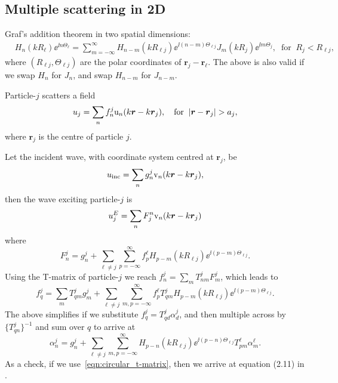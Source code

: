 \documentclass[ 12pt, a4paper]{article}
\renewcommand{\vec}[1]{\boldsymbol{#1}}
\begin{document}
\subsection{Multiple scattering in 2D}

Graf's addition theorem in two spatial dimensions:
\begin{align}
  & H_n(k R_\ell)\ee^{\ii n \Theta_\ell} =
  \sum_{m=-\infty}^\infty H_{n-m}(k R_{\ell j})\ee^{\ii(n-m)\Theta_{\ell j}} J_{m}(k R_j)\ee^{\ii m \Theta_j}, \;\;\text{for}\;\; R_j < R_{\ell j},
\label{eqn:Graf}
\end{align}
where $(R_{\ell j},\Theta_{\ell j})$ are the polar coordinates of $\vec r_j - \vec r_\ell$. The above is also valid if we swap $H_n$  for $J_n$, and swap $H_{n-m}$ for $J_{n-m}$.

Particle-$j$ scatters a field
\begin{equation}
  \label{eqn:outwaves}
  u_j = \sum_{n} f_n^j \mathrm u_{n}(k\rv - k \rv_j), \quad \text{for} \;\; |\rv - \rv_j| > a_j,
\end{equation}
where $\vec r_j$ is the centre of particle $j$.

Let the incident wave, with coordinate system centred at $\vec r_j$, be
\begin{equation}
  \label{eqn:incident}
  \ui = \sum_{n} g_n^j \mathrm v_{n}(k\rv - k \rv_j),
\end{equation}
then the wave exciting particle-$j$ is
\begin{equation}
  \label{eqn:exciter}
  u_j^E = \sum_{n} F^n_j \mathrm v_{n}(k\rv - k \rv_j)
\end{equation}
where
\begin{equation}
  F_n^j = g_n^j + \sum_{\ell\not = j} \sum_{p=-\infty}^\infty f_p^\ell H_{p-m}(k R_{\ell j})\ee^{\ii(p-m)\Theta_{\ell j}}.
\end{equation}
Using the T-matrix of particle-$j$ we reach $f_n^j = \sum_m T_{nm}^j F_m^j$, which leads to
\begin{equation}
f_q^j  = \sum_{m} T_{qm}^j g_m^j + \sum_{\ell\not = j} \sum_{m,p=-\infty}^\infty f_p^\ell T_{qm}^j H_{p-m}(k R_{\ell j})\ee^{\ii(p-m)\Theta_{\ell j}}.
\label{eqn:As}
\end{equation}
The above simplifies if we substitute $f_q^j =  T_{qd}^j \alpha_d^j$, and then multiple across by $\{T_{qn}^j\}^{-1}$ and sum over $q$ to arrive at
\begin{equation}
\alpha_n^j = g_n^j + \sum_{\ell\not = j} \sum_{m,p=-\infty}^\infty  H_{p-n}(k R_{\ell j})\ee^{\ii(p - n)\Theta_{\ell j}} T_{pm}^\ell \alpha_m^\ell.
\label{eqn:As}
\end{equation}
As a check, if we use~\eqref{eqn:circular_t-matrix}, then we arrive at equation (2.11) in \cite{gower_reflection_2017}.
\end{document}
